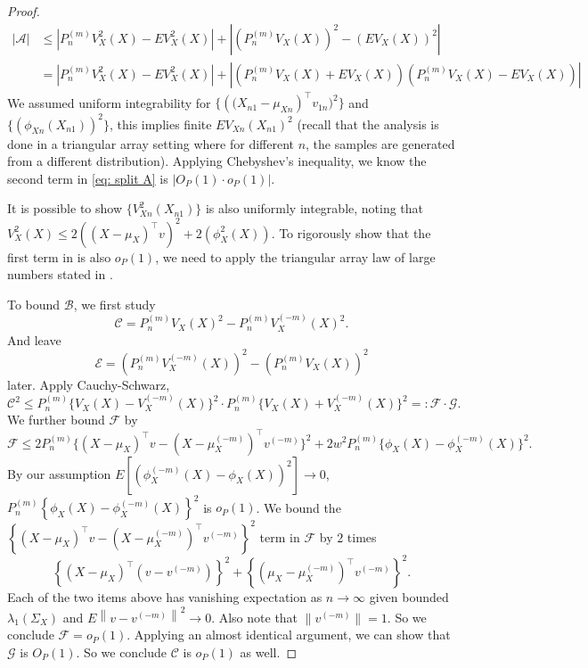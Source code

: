 \documentclass[11pt]{article}
\begin{document}
\begin{proof}
\begin{equation}
\begin{aligned}
|\mathcal{A}| & \leq\left|P_n^{(m)} V_X^2(X)-E V_X^2(X)\right|+\left|\left(P_n^{(m)} V_X(X)\right)^2-\left(E V_X(X)\right)^2\right| \\
& =\left|P_n^{(m)} V^2_X(X)-E V^2_X(X)\right|+\left|\left(P_n^{(m)} V_X(X)+E V_X(X)\right)\left(P_n^{(m)} V_X(X)-E V_X(X)\right)\right|
\end{aligned}
\end{equation}
We assumed uniform integrability for $\{\left((X_{n1}-\mu_{Xn}\right)^{\top} v_{1n})^2\}$ and $\{(\phi_{Xn}(X_{n1}))^2\}$, this implies finite $EV_{Xn}(X_{n1})^2$ (recall that the analysis is done in a triangular array setting where for different $n$, the samples are generated from a different distribution). Applying Chebyshev's inequality, we know the second term in \eqref{eq: split A} is $|O_P(1) \cdot o_P(1)|$.

It is possible to show $\{V^2_{Xn}(X_{n1})\}$ is also uniformly integrable, noting that $V_X^2(X) \leq 2(\left(X-\mu_X\right)^{\top} v)^2 + 2(\phi_X^2(X))$. To rigorously show that the first term in  is also $o_P(1)$, we need to apply the triangular array law of large numbers stated in .

To bound $\mathcal{B}$, we first study
\begin{equation*}
\mathcal{C}=P_n^{(m)} V_X(X)^2-P_n^{(m)} V_X^{(-m)}(X)^2 .
\end{equation*}
And leave 
\begin{equation*}
\mathcal{E}=\left(P_n^{(m)} V_X^{(-m)}(X)\right)^2-\left(P_n^{(m)} V_X(X)\right)^2
\end{equation*}
later.
Apply Cauchy-Schwarz,
\begin{equation*}
    \mathcal{C}^2 \leq P_n^{(m)}\{V_X(X) - V_X^{(-m)}(X)\}^2 \cdot P_n^{(m)} \{V_X(X) + V_X^{(-m)}(X)\}^2 =: \mathcal{F}\cdot \mathcal{G}.
\end{equation*}
We further bound $\mathcal{F}$ by
\begin{equation*}
    \mathcal{F} \leq 2P_n^{(m)}\{(X - \mu_X)^\top v - (X - \mu_X^{(-m)})^\top v^{(-m)}\}^2 + 2w^2P_n^{(m)}\{\phi_X(X) - \phi_X^{(-m)}(X)\}^2.
\end{equation*}
By our assumption $E\left[\left(\phi_X^{(-m)}(X)-\phi_X(X)\right)^2\right]\rightarrow 0$, $P_n^{(m)}\left\{\phi_X(X)-\phi_X^{(-m)}(X)\right\}^2$ is $o_P(1)$. We bound the $\left\{\left(X-\mu_X\right)^{\top} v-\left(X-\mu_X^{(-m)}\right)^{\top} v^{(-m)}\right\}^2$ term in $\mathcal{F}$ by $2$ times
\begin{equation*}
    \left\{\left(X-\mu_X\right)^{\top}\left(v-v^{(-m)}\right)\right\}^2+\left\{\left(\mu_X-\mu_X^{(-m)}\right)^{\top} v^{(-m)}\right\}^2.
\end{equation*}
Each of the two items above has vanishing expectation as $n\rightarrow\infty$ given bounded $\lambda_1(\Sigma_X)$ and $E\left\|v-v^{(-m)}\right\|^2 \rightarrow 0$. Also note that $\|v^{(-m)}\| =1$. So we conclude $\mathcal{F} = o_P(1)$. Applying an almost identical argument, we can show that $\mathcal{G}$ is $O_P(1)$. So we conclude $\mathcal{C}$ is $o_P(1)$ as well.


\end{proof}
\end{document}
